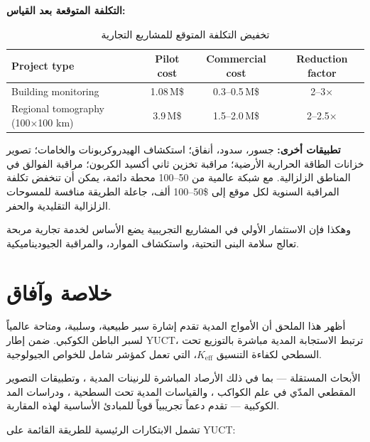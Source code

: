 \documentclass[12pt,a4paper]{article}
\newcommand{\Keff}{K_{\mathrm{eff}}}
\theoremstyle{remark}
\begin{document}
	\textbf{التكلفة المتوقعة بعد القياس:}
	
	\begin{otherlanguage}{english}
		\begin{table}[htbp]
			\centering
			\caption{تخفيض التكلفة المتوقع للمشاريع التجارية}
			\label{tab:scaling}
			\begin{tabular}{lccc}
				\toprule
				\textbf{Project type} & \textbf{Pilot cost} & \textbf{Commercial cost} & \textbf{Reduction factor} \\
				\midrule
				Building monitoring & 1.08\,M\$ & 0.3–0.5\,M\$ & 2–3× \\
				Regional tomography (100×100 km) & 3.9\,M\$ & 1.5–2.0\,M\$ & 2–2.5× \\
				\bottomrule
			\end{tabular}
		\end{table}
	\end{otherlanguage}
	
	\textbf{تطبيقات أخرى:} جسور، سدود، أنفاق؛ استكشاف الهيدروكربونات والخامات؛ تصوير خزانات الطاقة الحرارية الأرضية؛ مراقبة تخزين ثاني أكسيد الكربون؛ مراقبة الفوالق في المناطق الزلزالية. مع شبكة عالمية من 50–100 محطة دائمة، يمكن أن تنخفض تكلفة المراقبة السنوية لكل موقع إلى \$50–100 ألف، جاعلة الطريقة منافسة للمسوحات الزلزالية التقليدية والحفر.
	
	وهكذا فإن الاستثمار الأولي في المشاريع التجريبية يضع الأساس لخدمة تجارية مربحة تعالج سلامة البنى التحتية، واستكشاف الموارد، والمراقبة الجيوديناميكية.
	
	\section{خلاصة وآفاق}
	\label{sec:conclusion}
	
	أظهر هذا الملحق أن الأمواج المدية تقدم إشارة سبر طبيعية، وسلبية، ومتاحة عالمياً لسبر الباطن الكوكبي. ضمن إطار YUCT، ترتبط الاستجابة المدية مباشرة بالتوزيع تحت السطحي لكفاءة التنسيق \(\Keff\)، التي تعمل كمؤشر شامل للخواص الجيولوجية.
	
	الأبحاث المستقلة — بما في ذلك الأرصاد المباشرة للرنينات المدية \cite{Sibgatulin2014}، وتطبيقات التصوير المقطعي المدّي في علم الكواكب \cite{RoviraNavarro2025}، والقياسات المدية تحت السطحية \cite{Rogister2024}، ودراسات المد الكوكبية \cite{Briaud2025} — تقدم دعماً تجريبياً قوياً للمبادئ الأساسية لهذه المقاربة.
	
	تشمل الابتكارات الرئيسية للطريقة القائمة على YUCT:
	
\end{document}
